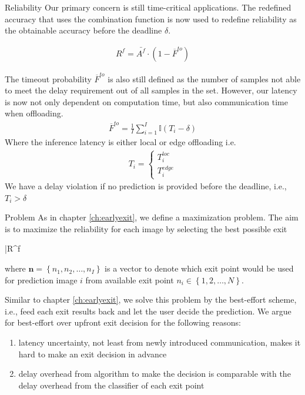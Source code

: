 \begin{enumdescript}
	\item[Reliability]  Our primary concern is still time-critical applications. The redefined accuracy that uses the combination function is now used to redefine reliability as the obtainable accuracy before the deadline $ \delta $.
	
	\begin{align}
	R^f= \bar{A^f} \cdot (1-\overline{F}^{to})
	\end{align}
	
	The timeout probability $ \overline{F}^{to} $ is also still defined as the number of samples not able to meet the delay requirement out of all samples in the set. However, our latency is now not only dependent on computation time, but also communication time when offloading.
	\begin{align}
	\overline{F}^{to}=\frac{1}{I}\sum_{i=1}^{I} \mathbb{I}\left(T_{i}-\delta\right)
	\end{align}
	Where the inference latency is either local or edge offloading i.e.
	\begin{align*}
	T_{i} = \begin{cases}
	T_{i}^{loc} \\
	T_{i}^{edge}
	\end{cases}
	\end{align*}
	We have a delay violation if no prediction is provided before the deadline, i.e., $ T_{i} > \delta $  
	
	\item[Problem] As in chapter \ref{ch:earlyexit}, we define a maximization problem. The aim is to maximize the reliability for each image by selecting the best possible exit
	\begin{maxi}
		{}{\bar{R}^f}
		{}{}
	\end{maxi}
	where $ \bm{n} = \left\{ n_1, n_2, \dots, n_I \right\}$ is a vector to denote which exit point would be used for prediction image $ i $ from available exit point $ n_i \in \left\{1,2, \dots, N\right\} $.
	
	Similar to chapter \ref{ch:earlyexit}, we solve this problem by the best-effort scheme, i.e., feed each exit results back and let the user decide the prediction. We argue for best-effort over upfront exit decision for the following reasons:
	\begin{enumerate}
		\item latency uncertainty, not least from newly introduced communication, makes it hard to make an exit decision in advance
		\item delay overhead from algorithm to make the decision is comparable with the delay overhead from the classifier of each exit point \cite{li_edge_2018}
	\end{enumerate}
	
	
\end{enumdescript}  

